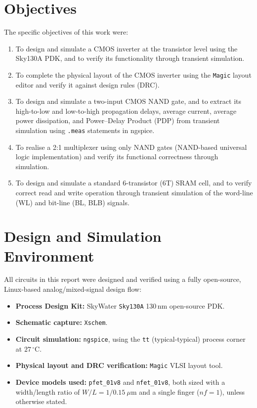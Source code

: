 \documentclass[11pt,a4paper]{article}
\begin{document}
\section{Objectives}
The specific objectives of this work were:

\begin{enumerate}[label=(\roman*)]
    \item To design and simulate a CMOS inverter at the transistor level
    using the Sky130A PDK, and to verify its functionality through
    transient simulation.
    \item To complete the physical layout of the CMOS inverter using the
    \texttt{Magic} layout editor and verify it against design rules (DRC).
    \item To design and simulate a two-input CMOS NAND gate, and to extract
    its high-to-low and low-to-high propagation delays, average current,
    average power dissipation, and Power--Delay Product (PDP) from
    transient simulation using \texttt{.meas} statements in ngspice.
    \item To realise a 2:1 multiplexer using only NAND gates (NAND-based
    universal logic implementation) and verify its functional correctness
    through simulation.
    \item To design and simulate a standard 6-transistor (6T) SRAM cell,
    and to verify correct read and write operation through transient
    simulation of the word-line (WL) and bit-line (BL, BLB) signals.
\end{enumerate}

\section{Design and Simulation Environment}
All circuits in this report were designed and verified using a fully
open-source, Linux-based analog/mixed-signal design flow:

\begin{itemize}
    \item \textbf{Process Design Kit:} SkyWater \texttt{Sky130A} 130\,nm
    open-source PDK.
    \item \textbf{Schematic capture:} \texttt{Xschem}.
    \item \textbf{Circuit simulation:} \texttt{ngspice}, using the
    \texttt{tt} (typical-typical) process corner at $27\,^{\circ}\mathrm{C}$.
    \item \textbf{Physical layout and DRC verification:} \texttt{Magic}
    VLSI layout tool.
    \item \textbf{Device models used:} \texttt{pfet\_01v8} and
    \texttt{nfet\_01v8}, both sized with a width/length ratio of
    $W/L = 1/0.15\ \mu\text{m}$ and a single finger ($nf = 1$), unless
    otherwise stated.
\end{itemize}
\end{document}
